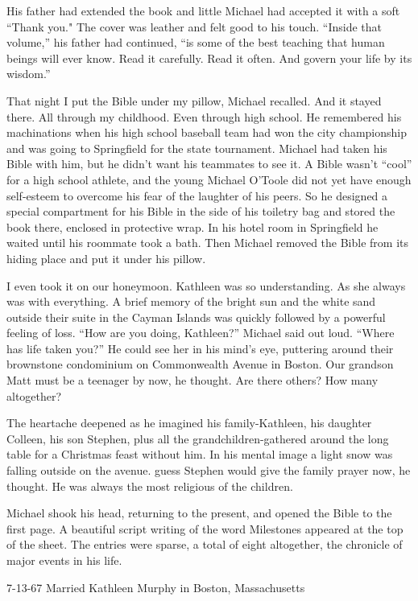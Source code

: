 \documentclass[]{article}
\begin{document}
{His father had extended the book and little Michael had accepted it with a soft “Thank you."  The cover was leather and felt good to his touch.  “Inside that volume,” his father had continued, “is some of the best teaching that human beings will ever know.  Read it carefully.  Read it often.  And govern your life by its wisdom.”

That night I put the Bible under my pillow, Michael recalled.  And it stayed there.  All through my childhood.  Even through high school.  He remembered his machinations when his high school baseball team had won the city championship and was going to Springfield for the state tournament.  Michael had taken his Bible with him, but he didn’t want his teammates to see it.  A Bible wasn’t “cool” for a high school athlete, and the young Michael O’Toole did not yet have enough self-esteem to overcome his fear of the laughter of his peers.  So he designed a special compartment for his Bible in the side of his toiletry bag and stored the book there, enclosed in protective wrap.  In his hotel room in Springfield he waited until his roommate took a bath.  Then Michael removed the Bible from its hiding place and put it under his pillow.

I even took it on our honeymoon.  Kathleen was so understanding.  As she always was with everything.  A brief memory of the bright sun and the white sand outside their suite in the Cayman Islands was quickly followed by a powerful feeling of loss.  “How are you doing, Kathleen?” Michael said out loud.  “Where has life taken you?” He could see her in his mind’s eye, puttering around their brownstone condominium on Commonwealth Avenue in Boston.  Our grandson Matt must be a teenager by now, he thought.  Are there others? How many altogether?

The heartache deepened as he imagined his family-Kathleen, his daughter Colleen, his son Stephen, plus all the grandchildren-gathered around the long table for a Christmas feast without him.  In his mental image a light snow was falling outside on the avenue.  guess Stephen would give the family prayer now, he thought.  He was always the most religious of the children.

Michael shook his head, returning to the present, and opened the Bible to the first page.  A beautiful script writing of the word Milestones appeared at the top of the sheet.  The entries were sparse, a total of eight altogether, the chronicle of major events in his life.

7-13-67 Married Kathleen Murphy in Boston, Massachusetts

}
\end{document}
